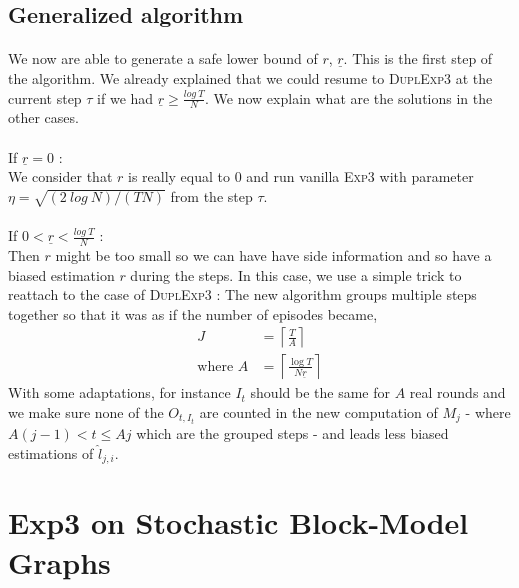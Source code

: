 \documentclass[11pt,a4paper]{article}
\begin{document}
\subsection{Generalized algorithm}
\paragraph{}We now are able to generate a safe lower bound of $r$, $\underline{r}$. This is the first step of the algorithm. We already explained that we could resume to \textsc{DuplExp3} at the current step $\tau$ if we had $ \underline{r} \geq \frac{log\ T}{N}$. We now explain what are the solutions in the other cases.\\

\paragraph{} If $\underline{r}=0$ : \\
We consider that $r$ is really equal to $0$ and run vanilla \textsc{Exp3} with parameter $\eta=\sqrt{\left(2\ log\ N \right)/\left(TN\right)}$ from the step $\tau$.

\paragraph{}If $0 < \underline{r} < \frac{log\ T}{N}$ :\\
Then $r$ might be too small so we can have have side information and so have a biased estimation $r$ during the steps. In this case, we use a simple trick to reattach to the case of \textsc{DuplExp3} : The new algorithm groups multiple steps together so that it was as if the number of episodes became,
\begin{align*}
J &= \left\lceil \frac{T}{A} \right\rceil \\
\text{where }A & =\left\lceil \frac{\log T}{N \underline{r}} \right\rceil
\end{align*}
With some adaptations, for instance $I_t$ should be the same for $A$ real rounds and we make sure none of the $O_{t,I_t}$ are counted in the new computation of $M_j$ - where $A(j-1)<t\leq Aj$ which are the grouped steps - and leads less biased estimations of $\hat{l}_{j,i}$.

\section{Exp3 on Stochastic Block-Model Graphs}
\end{document}
